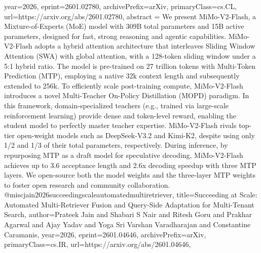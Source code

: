 {      year={2026},
      eprint={2601.02780},
      archivePrefix={arXiv},
      primaryClass={cs.CL},
      url={https://arxiv.org/abs/2601.02780},
      abstract = {We present MiMo-V2-Flash, a Mixture-of-Experts (MoE) model with 309B total parameters and 15B active parameters, designed for fast, strong reasoning and agentic capabilities. MiMo-V2-Flash adopts a hybrid attention architecture that interleaves Sliding Window Attention (SWA) with global attention, with a 128-token sliding window under a 5:1 hybrid ratio. The model is pre-trained on 27 trillion tokens with Multi-Token Prediction (MTP), employing a native 32k context length and subsequently extended to 256k. To efficiently scale post-training compute, MiMo-V2-Flash introduces a novel Multi-Teacher On-Policy Distillation (MOPD) paradigm. In this framework, domain-specialized teachers (e.g., trained via large-scale reinforcement learning) provide dense and token-level reward, enabling the student model to perfectly master teacher expertise. MiMo-V2-Flash rivals top-tier open-weight models such as DeepSeek-V3.2 and Kimi-K2, despite using only 1/2 and 1/3 of their total parameters, respectively. During inference, by repurposing MTP as a draft model for speculative decoding, MiMo-V2-Flash achieves up to 3.6 acceptance length and 2.6x decoding speedup with three MTP layers. We open-source both the model weights and the three-layer MTP weights to foster open research and community collaboration.}
}@misc{jain2026succeedingscaleautomatedmultiretriever,
      title={Succeeding at Scale: Automated Multi-Retriever Fusion and Query-Side Adaptation for Multi-Tenant Search}, 
      author={Prateek Jain and Shabari S Nair and Ritesh Goru and Prakhar Agarwal and Ajay Yadav and Yoga Sri Varshan Varadharajan and Constantine Caramanis},
      year={2026},
      eprint={2601.04646},
      archivePrefix={arXiv},
      primaryClass={cs.IR},
      url={https://arxiv.org/abs/2601.04646},
}
